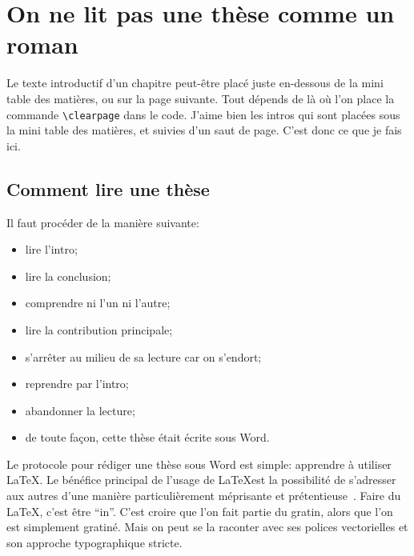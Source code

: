 
\chapter{On ne lit pas une thèse comme un roman}
	\minitoc


Le texte introductif d'un chapitre peut-être placé juste en-dessous de la mini table des matières, ou sur la page suivante.
Tout dépends de là où l'on place la commande \verb|\clearpage| dans le code.
J'aime bien les intros qui sont placées sous la mini table des matières, et suivies d'un saut de page.
C'est donc ce que je fais ici.
\clearpage

\section{Comment lire une thèse}
    Il faut procéder de la manière suivante:
    \begin{itemize}
        \item lire l'intro;
        \item lire la conclusion;
        \item comprendre ni l'un ni l'autre;
        \item lire la contribution principale;
        \item s'arrêter au milieu de sa lecture car on s'endort;
        \item reprendre par l'intro;
        \item abandonner la lecture;
        \item de toute façon, cette thèse était écrite sous Word.
    \end{itemize}

    Le protocole pour rédiger une thèse sous Word est simple: apprendre à utiliser \LaTeX.
    Le bénéfice principal de l'usage de \LaTeX est la possibilité de s'adresser aux autres d'une manière particulièrement méprisante et prétentieuse~\cite{Louvet17}.
    Faire du \LaTeX, c'est être \enquote{in}.
    C'est croire que l'on fait partie du gratin, alors que l'on est simplement gratiné.
    Mais on peut se la raconter avec ses polices vectorielles et son approche typographique stricte.

